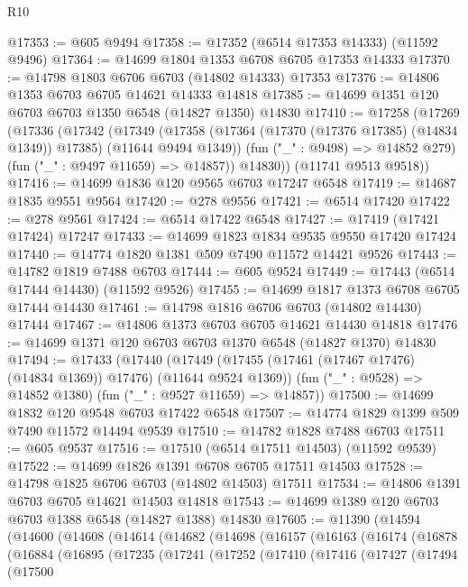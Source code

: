 \begin{lexlean}{R10}
\begin{coremodule}
@17353 := @605 @9494
@17358 := @17352 (@6514 @17353 @14333) (@11592 @9496)
@17364 := @14699 @1804 @1353 @6708 @6705 @17353 @14333
@17370 := @14798 @1803 @6706 @6703 (@14802 @14333) @17353
@17376 := @14806 @1353 @6703 @6705 @14621 @14333 @14818
@17385 := @14699 @1351 @120 @6703 @6703 @1350 @6548 (@14827 @1350) @14830
@17410 := @17258
    (@17269
      (@17336
        (@17342
          (@17349
            (@17358 (@17364 (@17370 (@17376 @17385) (@14834 @1349)) @17385) (@11644 @9494 @1349))
            (fun ("_" : @9498) => @14852 @279)
            (fun ("_" : @9497 @11659) => @14857))
          @14830))
      (@11741 @9513 @9518))
@17416 := @14699 @1836 @120 @9565 @6703 @17247 @6548
@17419 := @14687 @1835 @9551 @9564
@17420 := @278 @9556
@17421 := @6514 @17420
@17422 := @278 @9561
@17424 := @6514 @17422 @6548
@17427 := @17419 (@17421 @17424) @17247
@17433 := @14699 @1823 @1834 @9535 @9550 @17420 @17424
@17440 := @14774 @1820 @1381 @509 @7490 @11572 @14421 @9526
@17443 := @14782 @1819 @7488 @6703
@17444 := @605 @9524
@17449 := @17443 (@6514 @17444 @14430) (@11592 @9526)
@17455 := @14699 @1817 @1373 @6708 @6705 @17444 @14430
@17461 := @14798 @1816 @6706 @6703 (@14802 @14430) @17444
@17467 := @14806 @1373 @6703 @6705 @14621 @14430 @14818
@17476 := @14699 @1371 @120 @6703 @6703 @1370 @6548 (@14827 @1370) @14830
@17494 := @17433
    (@17440
      (@17449 (@17455 (@17461 (@17467 @17476) (@14834 @1369)) @17476) (@11644 @9524 @1369))
      (fun ("_" : @9528) => @14852 @1380)
      (fun ("_" : @9527 @11659) => @14857))
@17500 := @14699 @1832 @120 @9548 @6703 @17422 @6548
@17507 := @14774 @1829 @1399 @509 @7490 @11572 @14494 @9539
@17510 := @14782 @1828 @7488 @6703
@17511 := @605 @9537
@17516 := @17510 (@6514 @17511 @14503) (@11592 @9539)
@17522 := @14699 @1826 @1391 @6708 @6705 @17511 @14503
@17528 := @14798 @1825 @6706 @6703 (@14802 @14503) @17511
@17534 := @14806 @1391 @6703 @6705 @14621 @14503 @14818
@17543 := @14699 @1389 @120 @6703 @6703 @1388 @6548 (@14827 @1388) @14830
@17605 := @11390
    (@14594
      (@14600
        (@14608
          (@14614
            (@14682
              (@14698
                (@16157
                  (@16163
                    (@16174
                      (@16878
                        (@16884
                          (@16895
                            (@17235
                              (@17241
                                (@17252
                                  (@17410
                                    (@17416
                                      (@17427
                                        (@17494
                                          (@17500

\end{coremodule}
\end{lexlean}
